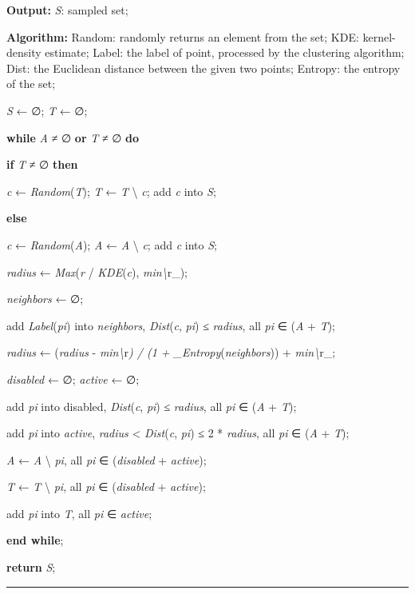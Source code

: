 \documentclass[]{article}
\begin{document}
\textbf{Output: } \emph{S}: sampled set;

\textbf{Algorithm: } Random: randomly returns an element from the set;
KDE: kernel-density estimate; Label: the label of point, processed by
the clustering algorithm; Dist: the Euclidean distance between the given
two points; Entropy: the entropy of the set;

\emph{S} ← ∅; \emph{T} ← ∅;

\textbf{while} \emph{A} ≠ ∅ \textbf{or} \emph{T} ≠ ∅ \textbf{do}

\textbf{if} \emph{T} ≠ ∅ \textbf{then}

\emph{c} ← \emph{Random}(\emph{T}); \emph{T} ← \emph{T} \textbackslash{}
\emph{c}; add \emph{c} into \emph{S};

\textbf{else}

\emph{c} ← \emph{Random}(\emph{A}); \emph{A} ← \emph{A} \textbackslash{}
\emph{c}; add \emph{c} into \emph{S};

\emph{radius} ← \emph{Max}(\emph{r} / \emph{KDE}(\emph{c}),
\emph{min\textbackslash{}}r\_);

\emph{neighbors} ← ∅;

add \emph{Label}(\emph{pi}) into \emph{neighbors}, \emph{Dist}(\emph{c},
\emph{pi}) ≤ \emph{radius}, all \emph{pi} ∈ (\emph{A} + \emph{T});

\emph{radius} ← (\emph{radius} - \emph{min\textbackslash{}}r\emph{) / (1
+ \_Entropy}(\emph{neighbors})) + \emph{min\textbackslash{}}r\_;

\emph{disabled} ← ∅; \emph{active} ← ∅;

add \emph{pi} into disabled, \emph{Dist}(\emph{c}, \emph{pi}) ≤
\emph{radius}, all \emph{pi} ∈ (\emph{A} + \emph{T});

add \emph{pi} into \emph{active}, \emph{radius} \textless{}
\emph{Dist}(\emph{c}, \emph{pi}) ≤ 2 * \emph{radius}, all \emph{pi} ∈
(\emph{A} + \emph{T});

\emph{A} ← \emph{A} \textbackslash{} \emph{pi}, all \emph{pi} ∈
(\emph{disabled} + \emph{active});

\emph{T} ← \emph{T} \textbackslash{} \emph{pi}, all \emph{pi} ∈
(\emph{disabled} + \emph{active});

add \emph{pi} into \emph{T}, all \emph{pi} ∈ \emph{active};

\textbf{end while};

\textbf{return} \emph{S};

\begin{center}\rule{0.5\linewidth}{\linethickness}\end{center}
\end{document}
